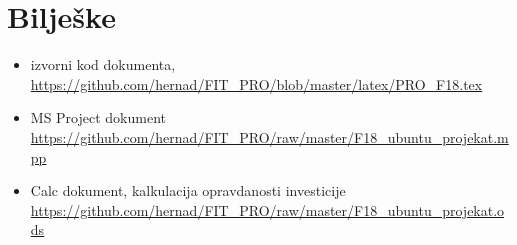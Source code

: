 \documentclass[times, utf8, seminar]{fit}
\begin{document}
\chapter{Bilješke}
\label{chap:biljeske}

\begin{itemize}
  \item izvorni kod dokumenta, \url{https://github.com/hernad/FIT_PRO/blob/master/latex/PRO_F18.tex}
  \item MS Project dokument \url{https://github.com/hernad/FIT_PRO/raw/master/F18_ubuntu_projekat.mpp}
  \item Calc dokument, kalkulacija opravdanosti investicije \url{https://github.com/hernad/FIT_PRO/raw/master/F18_ubuntu_projekat.ods}
\end{itemize}
\end{document}
